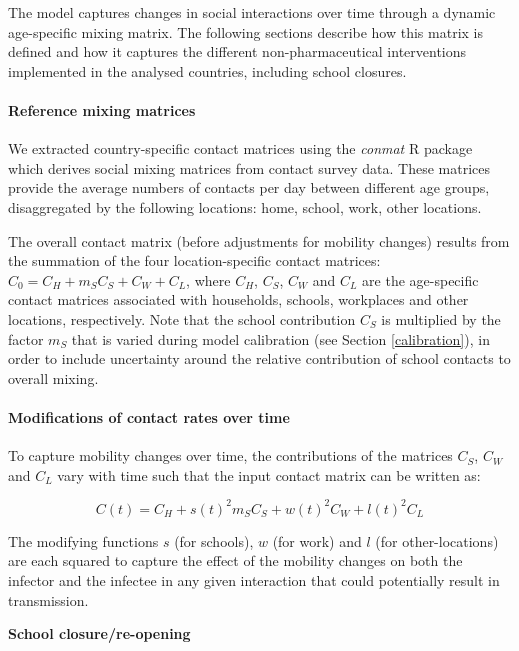 The model captures changes in social interactions over time through a dynamic age-specific mixing matrix. The following
sections describe how this matrix is defined and how it captures the different non-pharmaceutical interventions implemented
in the analysed countries, including school closures.

\paragraph{Reference mixing matrices}
We extracted country-specific contact matrices using the \textit{conmat} R package which derives social mixing matrices from 
contact survey data. These matrices provide the average numbers of contacts per day between different age groups, disaggregated by the following 
locations: home, school, work, other locations. 

The overall contact matrix (before adjustments for mobility changes) results from the summation of the four location-specific 
contact matrices: \(C_{0} = C_{H} + m_S C_{S} + C_{W} + C_{L}\), where \(C_{H}\), \(C_{S}\), \(C_{W}\) and \(C_{L}\) are the age-specific
contact matrices associated with households, schools, workplaces and other locations, respectively. Note that the school contribution $C_{S}$ is 
multiplied by the factor $m_S$ that is varied during model calibration (see Section \ref{calibration}), in order to include uncertainty around 
the relative contribution of school contacts to overall mixing.

\paragraph{Modifications of contact rates over time}
To capture mobility changes over time, the contributions of the matrices \(C_{S}\), \(C_{W}\) and \(C_{L}\) vary with time such that the input contact matrix can be written as:

\begin{equation}
  C(t)= C_{H}+ s(t)^{2} m_S C_{S}+ w(t)^{2}C_{W}+l(t)^{2}C_{L}
\end{equation}

The modifying functions $s$ (for schools), $w$ (for work) and $l$ (for other-locations) are each squared to capture the effect of the mobility changes on 
both the infector and the infectee in any given interaction that could potentially result in transmission. 

\vspace{5pt}
\textbf{School closure/re-opening}

